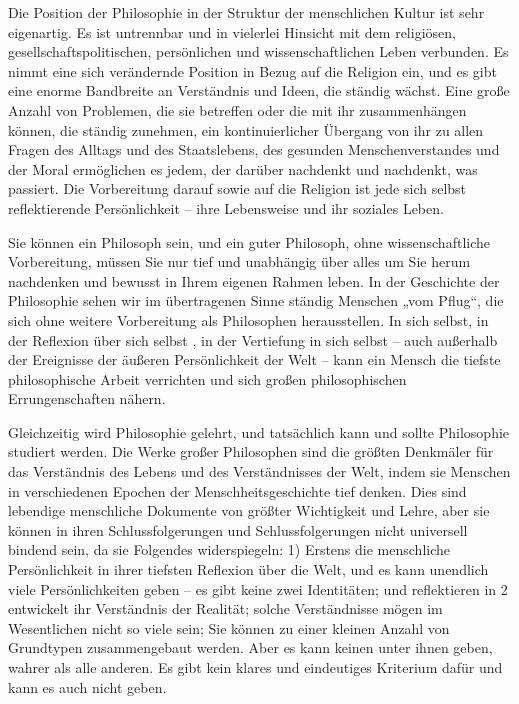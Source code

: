 \documentclass[11pt,a4paper]{book}
\begin{document}
Die Position der Philosophie in der Struktur der menschlichen Kultur ist sehr eigenartig. Es ist untrennbar und in vielerlei Hinsicht mit dem religiösen, gesellschaftspolitischen, persönlichen und wissenschaftlichen Leben verbunden. Es nimmt eine sich verändernde Position in Bezug auf die Religion ein, und es gibt eine enorme Bandbreite an Verständnis und Ideen, die ständig wächst. Eine große Anzahl von Problemen, die sie betreffen oder die mit ihr zusammenhängen können, die ständig zunehmen, ein kontinuierlicher Übergang von ihr zu allen Fragen des Alltags und des Staatslebens, des gesunden Menschenverstandes und der Moral ermöglichen es jedem, der darüber nachdenkt und nachdenkt, was passiert. Die Vorbereitung darauf sowie auf die Religion ist jede sich selbst reflektierende Persönlichkeit -- ihre Lebensweise und ihr soziales Leben.



Sie können ein Philosoph sein, und ein guter Philosoph, ohne wissenschaftliche Vorbereitung, müssen Sie nur tief und unabhängig über alles um Sie herum nachdenken und bewusst in Ihrem eigenen Rahmen leben. In der Geschichte der Philosophie sehen wir im übertragenen Sinne ständig Menschen „vom Pflug“, die sich ohne weitere Vorbereitung als Philosophen herausstellen. In sich selbst, in der Reflexion über sich selbst , in der Vertiefung in sich selbst -- auch außerhalb der Ereignisse der äußeren Persönlichkeit der Welt -- kann ein Mensch die tiefste philosophische Arbeit verrichten und sich großen philosophischen Errungenschaften nähern.



Gleichzeitig wird Philosophie gelehrt, und tatsächlich kann und sollte Philosophie studiert werden. Die Werke großer Philosophen sind die größten Denkmäler für das Verständnis des Lebens und des Verständnisses der Welt, indem sie Menschen in verschiedenen Epochen der Menschheitsgeschichte tief denken. Dies sind lebendige menschliche Dokumente von größter Wichtigkeit und Lehre, aber sie können in ihren Schlussfolgerungen und Schlussfolgerungen nicht universell bindend sein, da sie Folgendes widerspiegeln: 1) Erstens die menschliche Persönlichkeit in ihrer tiefsten Reflexion über die Welt, und es kann unendlich viele Persönlichkeiten geben -- es gibt keine zwei Identitäten; und reflektieren in 2 entwickelt ihr Verständnis der Realität; solche Verständnisse mögen im Wesentlichen nicht so viele sein; Sie können zu einer kleinen Anzahl von Grundtypen zusammengebaut werden. Aber es kann keinen unter ihnen geben, wahrer als alle anderen. Es gibt kein klares und eindeutiges Kriterium dafür und kann es auch nicht geben.
\end{document}
